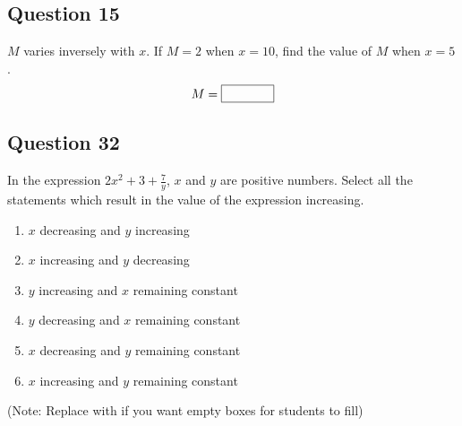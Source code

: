 \documentclass[12pt]{article}
\begin{document}
\subsection*{Question 15}
\(M\) varies inversely with \(x\). If \( M = 2 \) when \( x = 10 \), find the value of \(M\) when \( x = 5 \).
\[ M = \framebox[1.5cm]{\phantom{X}} \]

\subsection*{Question 32}
In the expression \( 2x^2 + 3 + \frac{7}{y} \), \(x\) and \(y\) are positive numbers. Select all the statements which result in the value of the expression increasing.
\begin{enumerate}[label=\Alph*.]
    \item[\XBox] \(x\) decreasing and \(y\) increasing
    \item[\XBox] \(x\) increasing and \(y\) decreasing
    \item[\XBox] \(y\) increasing and \(x\) remaining constant
    \item[\XBox] \(y\) decreasing and \(x\) remaining constant
    \item[\XBox] \(x\) decreasing and \(y\) remaining constant
    \item[\XBox] \(x\) increasing and \(y\) remaining constant
\end{enumerate}
(Note: Replace \XBox with \Square if you want empty boxes for students to fill)

\end{document}
